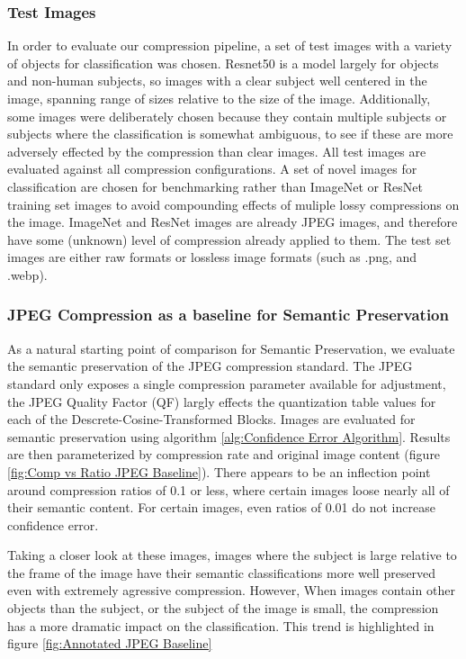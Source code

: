 \subsubsection{Test Images}

In order to evaluate our compression pipeline, a set of test images with a variety of objects for classification was chosen. Resnet50 is a model largely for objects and non-human subjects, so images with a clear subject well centered in the image, spanning range of sizes relative to the size of the image. Additionally, some images were deliberately chosen because they contain multiple subjects or subjects where the classification is somewhat ambiguous, to see if these are more adversely effected by the compression than clear images. All test images are evaluated against all compression configurations. A set of novel images for classification are chosen for benchmarking rather than ImageNet or ResNet training set images to avoid compounding effects of muliple lossy compressions on the image. ImageNet and ResNet images are already JPEG images, and therefore have some (unknown) level of compression already applied to them. The test set images are either raw formats or lossless image formats (such as .png, and .webp).


\subsubsection{JPEG Compression as a baseline for Semantic Preservation}

As a natural starting point of comparison for Semantic Preservation, we evaluate the semantic preservation of the JPEG compression standard.
The JPEG standard only exposes a single compression parameter available for adjustment, the JPEG Quality Factor (QF) largly effects the quantization table values for each of the Descrete-Cosine-Transformed Blocks.
Images are evaluated for semantic preservation using algorithm \ref{alg:Confidence Error Algorithm}.
Results are then parameterized by compression rate and original image content (figure \ref{fig:Comp vs Ratio JPEG Baseline}). There appears to be an inflection point around compression ratios of 0.1 or less, where certain images loose nearly all of their semantic content. For certain images, even ratios of 0.01 do not increase confidence error.

Taking a closer look at these images, images where the subject is large relative to the frame of the image have their semantic classifications more well preserved even with extremely agressive compression. However, When images contain other objects than the subject, or the subject of the image is small, the compression has a more dramatic impact on the classification. This trend is highlighted in figure \ref{fig:Annotated JPEG Baseline}


